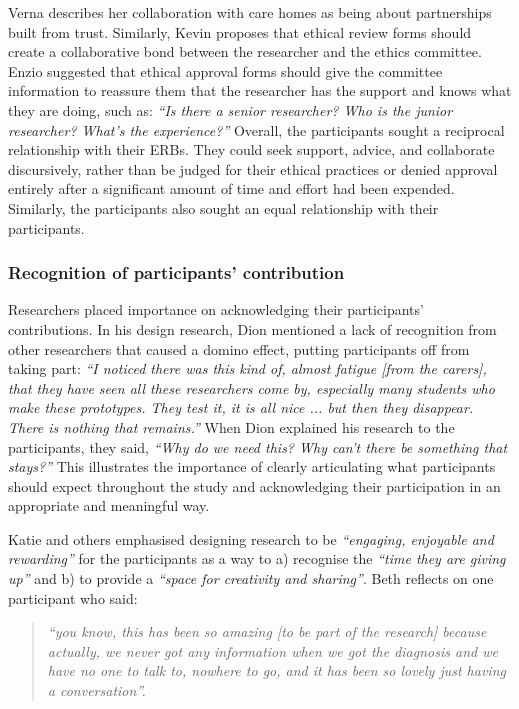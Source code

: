 Verna describes her collaboration with care homes as being about partnerships built from trust. Similarly, Kevin proposes that ethical review forms should create a collaborative bond between the researcher and the ethics committee. Enzio suggested that ethical approval forms should give the committee information to reassure them that the researcher has the support and knows what they are doing, such as: \textit{``Is there a senior researcher? Who is the junior researcher? What’s the experience?''} Overall, the participants sought a reciprocal relationship with their ERBs. They could seek support, advice, and collaborate discursively, rather than be judged for their ethical practices or denied approval entirely after a significant amount of time and effort had been expended. Similarly, the participants also sought an equal relationship with their participants.

\subsubsection{Recognition of participants' contribution}
\label{Ethics:ThemeOnePartTwo}
Researchers placed importance on acknowledging their participants’ contributions. In his design research, Dion mentioned a lack of recognition from other researchers that caused a domino effect, putting participants off from taking part: \textit{``I noticed there was this kind of, almost fatigue [from the carers], that they have seen all these researchers come by, especially many students who make these prototypes. They test it, it is all nice ... but then they disappear. There is nothing that remains.'' }
When Dion explained his research to the participants, they said, \textit{``Why do we need this? Why can’t there be something that stays?''} This illustrates the importance of clearly articulating what participants should expect throughout the study and acknowledging their participation in an appropriate and meaningful way. 

Katie and others emphasised designing research to be \textit{``engaging, enjoyable and rewarding''} for the participants as a way to a) recognise the \textit{``time they are giving up''} and b) to provide a \textit{``space for creativity and sharing''}. Beth reflects on one participant who said:

\begin{quote}
\textit{``you know, this has been so amazing [to be part of the research] because actually, we never got any information when we got the diagnosis and we have no one to talk to, nowhere to go, and it has been so lovely just having a conversation''. 
}
\end{quote}


